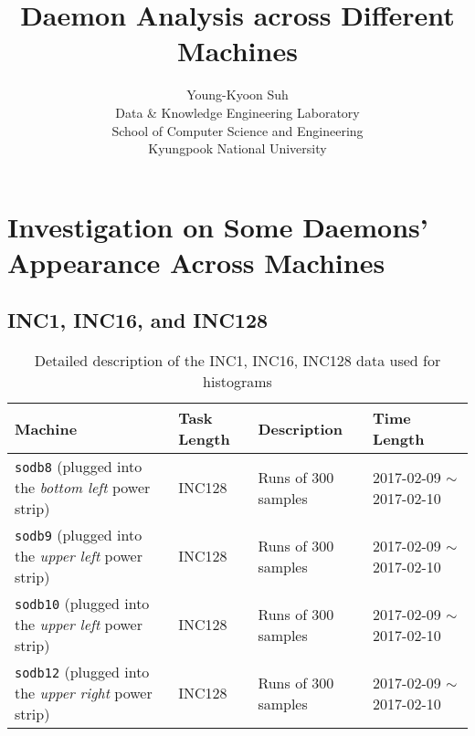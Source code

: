 \documentclass[10pt]{article}
\begin{document}
\title{Daemon Analysis across Different Machines}

\author{
Young-Kyoon Suh\\
Data \& Knowledge Engineering Laboratory\\
School of Computer Science and Engineering\\
Kyungpook National University\\
}
\maketitle

\section{Investigation on Some Daemons' Appearance Across Machines} 

\subsection{INC1, INC16, and INC128} 

\begin{table}[h]
\begin{center}
\begin{tabular}{|p{4cm}|p{3cm}|p{4cm}|p{4cm}|} \hline
Machine & Task Length & Description & Time Length\\ \hline
{\tt sodb8} (plugged into the {\em bottom left} power strip) & INC128 & Runs of 300 samples & 2017-02-09 $\sim$ 2017-02-10\\ \hline
{\tt sodb9}  (plugged into the {\em upper left} power strip)  & INC128 & Runs of 300 samples & 2017-02-09 $\sim$ 2017-02-10\\ \hline
{\tt sodb10}  (plugged into the {\em upper left} power strip)  & INC128 & Runs of 300 samples & 2017-02-09 $\sim$ 2017-02-10\\ \hline
{\tt sodb12}  (plugged into the {\em upper right} power strip)  & INC128 & Runs of 300 samples & 2017-02-09 $\sim$ 2017-02-10\\ \hline
\end{tabular}
\end{center}
\vspace{-.2in}
\caption{Detailed description of the INC1, INC16, INC128 data used for histograms\label{tab:exp_notesINCs}}
\end{table}
\end{document}
